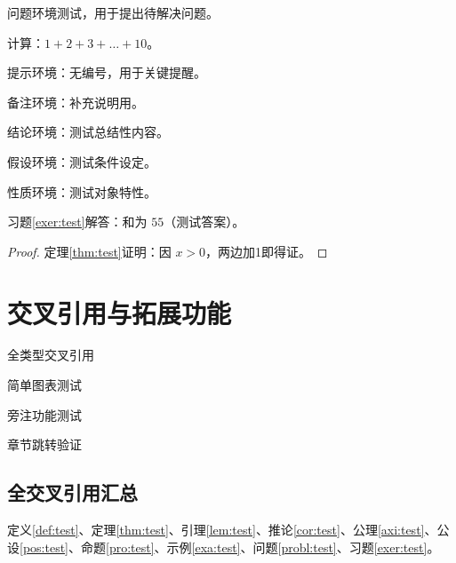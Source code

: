 \begin{definition}[测试定义]
\begin{theorem}[测试定理]
\begin{lemma}[测试引理]
\begin{corollary}[测试推论]
\begin{axiom}[测试公理]
\begin{postulate}[测试公设]
\begin{proposition}[测试命题]
\begin{problem}\label{probl:test}
问题环境测试，用于提出待解决问题。
\end{problem}

\begin{exercise}\label{exer:test}
计算：$1+2+3+\dots+10$。
\end{exercise}

\begin{note}
提示环境：无编号，用于关键提醒。
\end{note}

\begin{remark}
备注环境：补充说明用。
\end{remark}

\begin{conclusion}
结论环境：测试总结性内容。
\end{conclusion}

\begin{assumption}
假设环境：测试条件设定。
\end{assumption}

\begin{property}
性质环境：测试对象特性。
\end{property}

\begin{solution}
习题\ref{exer:test}解答：和为 $55$（测试答案）。
\end{solution}

\begin{proof}
定理\ref{thm:test}证明：因 $x>0$，两边加1即得证。
\end{proof}

\chapter{交叉引用与拓展功能}
\begin{introduction}
\item 全类型交叉引用
\item 简单图表测试
\item 旁注功能测试
\item 章节跳转验证
\end{introduction}

\section{全交叉引用汇总}
定义\ref{def:test}、定理\ref{thm:test}、引理\ref{lem:test}、推论\ref{cor:test}、公理\ref{axi:test}、公设\ref{pos:test}、命题\ref{pro:test}、示例\ref{exa:test}、问题\ref{probl:test}、习题\ref{exer:test}。


\end{proposition}
\end{postulate}
\end{axiom}
\end{corollary}
\end{lemma}
\end{theorem}
\end{definition}
